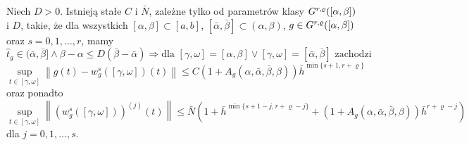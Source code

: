 \documentclass[oik, pdftex, robocza, man]{mgrwms}
\begin{document}
    \begin{stw} \label{2014_stw2}
        Niech $D > 0$. Istnieją stałe $C$ i $\bar{N}$, zależne tylko od parametrów klasy $G^{r,\varrho}([\alpha,\beta])$ i $D$, takie, że dla wszystkich $[\alpha, \beta] \subset [a,b]$, $[\bar{\alpha}, \bar{\beta}] \subset (\alpha, \beta)$, $g \in G^{r,\varrho}([\alpha,\beta])$ oraz $s=0,1,\dots,r$, mamy
        \begin{equation*}
            \hat{t}_{g} \in (\bar{\alpha}, \bar{\beta}] \land \beta-\alpha \leq D(\bar{\beta}-\bar{\alpha}) \Longrightarrow \text{dla } [\gamma, \omega]=[\alpha, \beta] \vee [\gamma, \omega]=[\bar{\alpha}, \bar{\beta}] \text{ zachodzi }
        \end{equation*}
        \begin{equation} \label{eq:19}
            \sup _{t \in[\gamma, \omega]}\left\|g(t)-w_{g}^{s}([\gamma, \omega])(t)\right\| \leq C\left(1+A_{g}(\alpha, \bar{\alpha}, \bar{\beta}, \beta)\right) \bar{h}^{\min \{s+1, r+\varrho\}}
        \end{equation}
        oraz ponadto
        \begin{equation*} \label{eq:20}
            \sup _{t \in[\gamma, \omega]}\left\|\left(w_{g}^{s}([\gamma, \omega])\right)^{(j)}(t)\right\| \leq \bar{N}\left(1+\bar{h}^{\min \{s+1-j, r+\varrho-j\}}+\left(1+A_{g}(\alpha, \bar{\alpha}, \bar{\beta}, \beta)\right) \bar{h}^{r+\varrho-j}\right)
        \end{equation*}
        dla $j=0,1,\dots,s$.
    \end{stw}
\end{document}
